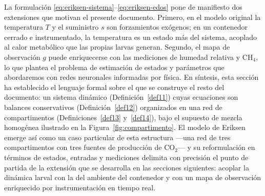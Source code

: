 \begin{remark}
La formulación \eqref{eq:eriksen-sistema}--\eqref{eq:eriksen-edos} pone de
manifiesto dos extensiones que motivan el presente documento. Primero, en el
modelo original la temperatura $T$ y el suministro $s$ son forzamientos
exógenos; en un contenedor cerrado e instrumentado, la temperatura es un
estado más del sistema, acoplado al calor metabólico que las propias larvas
generan. Segundo, el mapa de observación $g$ puede enriquecerse con las
mediciones de humedad relativa y CH$_4$, lo que plantea el problema de
estimación de estados y parámetros que abordaremos con redes neuronales
informadas por física. En síntesis, esta sección ha establecido el lenguaje
formal sobre el que se construye el resto del documento: un sistema dinámico
(Definición~\ref{def11}) cuyas ecuaciones son balances conservativos
(Definición~\ref{def12}) organizados en una red de compartimentos
(Definiciones~\ref{def13} y~\ref{def14}), bajo el supuesto de mezcla
homogénea ilustrado en la Figura~\ref{fig:compartimento}. El modelo de
Eriksen \cite{eriksenDynamicModellingFeed2022} emerge así como un caso particular de esta
estructura ---una red de tres compartimentos con tres fuentes de producción
de CO$_2$--- y su reformulación en términos de estados, entradas y
mediciones delimita con precisión el punto de partida de la extensión que se
desarrolla en las secciones siguientes: acoplar la dinámica larval con la
del ambiente del contenedor y con un mapa de observación enriquecido por
instrumentación en tiempo real.
\end{remark}

